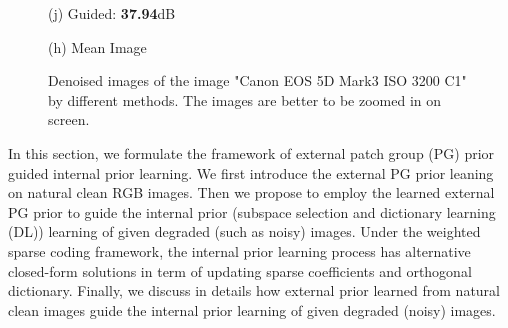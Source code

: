 \documentclass[10pt,twocolumn,letterpaper]{article}
\begin{document}
\begin{figure}
{\begin{minipage}[t]{0.195\textwidth}
{\footnotesize (j) Guided: \textbf{37.94}dB  }
\end{minipage}
\begin{minipage}[t]{0.195\textwidth}
\centering
{}
{\footnotesize (h) Mean Image \cite{crosschannel2016} }
\end{minipage}
}
\caption{Denoised images of the image "Canon EOS 5D Mark3 ISO 3200 C1" by different methods. The images are better to be zoomed in on screen.}\vspace{-4mm}
\label{fig3}
\end{figure}


In this section, we formulate the framework of external patch group (PG) prior guided internal prior learning. We first introduce the external PG prior leaning on natural clean RGB images. Then we propose to employ the learned external PG prior to guide the internal prior (subspace selection and dictionary learning (DL)) learning of given degraded (such as noisy) images. Under the weighted sparse coding framework, the internal prior learning process has alternative closed-form solutions in term of updating sparse coefficients and orthogonal dictionary. Finally, we discuss in details how external prior learned from natural clean images guide the internal prior learning of given degraded (noisy) images.
\end{document}
